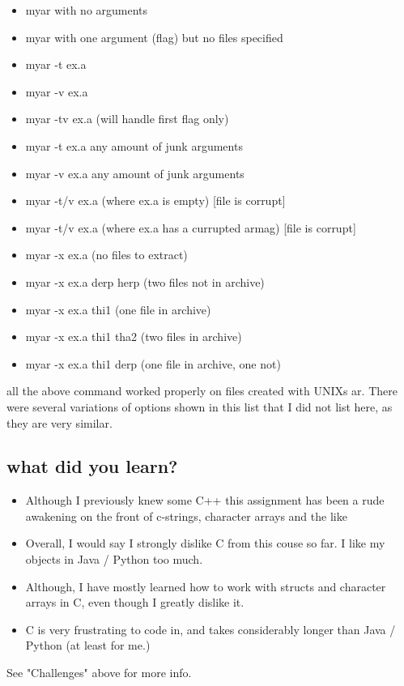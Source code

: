 \documentclass[letterpaper,10pt,titlepage]{article}
\begin{document}
\begin{itemize}
\item myar with no arguments
\item myar with one argument (flag) but no files specified
\item myar -t ex.a
\item myar -v ex.a
\item myar -tv ex.a   (will handle first flag only)
\item myar -t ex.a any amount of junk arguments
\item myar -v ex.a any amount of junk arguments
\item myar -t/v ex.a (where ex.a is empty) [file is corrupt]
\item myar -t/v ex.a (where ex.a has a currupted armag) [file is corrupt]
\item myar -x ex.a (no files to extract)
\item myar -x ex.a derp herp (two files not in archive)
\item myar -x ex.a thi1 (one file in archive)
\item myar -x ex.a thi1 tha2 (two files in archive)
\item myar -x ex.a thi1 derp (one file in archive, one not)
\end{itemize}

all the above command worked properly on files created with UNIXs ar.  There were several variations of options shown in this list that I did not list here, as they are very similar.

\subsection{what did you learn?}

\begin{itemize}
\item Although I previously knew some C++ this assignment has been a rude awakening on the front of c-strings, character arrays and the like
\item Overall, I would say I strongly dislike C from this couse so far.  I like my objects in Java / Python too much.
\item Although, I have mostly learned how to work with structs and character arrays in C, even though I greatly dislike it.
\item C is very frustrating to code in, and takes considerably longer than Java / Python (at least for me.)
\end{itemize}

See "Challenges" above for more info.
\end{document}
